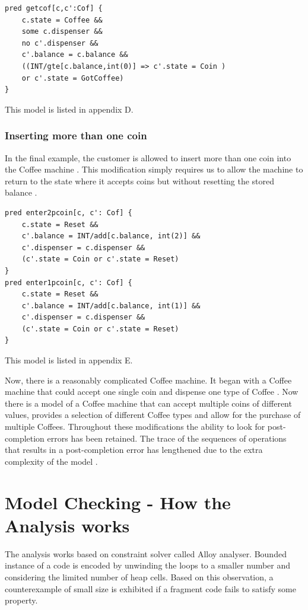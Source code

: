 \documentclass[a4paper,12pt]{report}
\begin{document}
\begin{verbatim}
pred getcof[c,c':Cof] {
	c.state = Coffee &&
	some c.dispenser &&
	no c'.dispenser &&
	c'.balance = c.balance &&
	((INT/gte[c.balance,int(0)] => c'.state = Coin )
	or c'.state = GotCoffee)
}
\end{verbatim}

This model is listed in appendix D.

\subsection{Inserting more than one coin}
\label{Inserting more than one coin}

In the final example, the customer is allowed to insert more than one coin into the Coffee machine \cite{RussellBoyatt}. This modification simply requires us to allow the machine to return to the state where it accepts coins but without resetting the stored balance \cite{RussellBoyatt}.

\begin{verbatim}
pred enter2pcoin[c, c': Cof] {
	c.state = Reset &&
	c'.balance = INT/add[c.balance, int(2)] &&
	c'.dispenser = c.dispenser &&
	(c'.state = Coin or c'.state = Reset)
}
pred enter1pcoin[c, c': Cof] {
	c.state = Reset &&
	c'.balance = INT/add[c.balance, int(1)] &&
	c'.dispenser = c.dispenser &&
	(c'.state = Coin or c'.state = Reset)
}
\end{verbatim}

This model is listed in appendix E.

Now, there is a reasonably complicated Coffee machine. It began with a Coffee machine that could accept one single coin and dispense one type of Coffee \cite{RussellBoyatt}. Now there is a model of a Coffee machine that can accept multiple coins of different values, provides a selection of different Coffee types and allow for the purchase of multiple Coffees. Throughout these modifications the ability to look for post-completion errors has been retained. The trace of the sequences of operations that results in a post-completion error has lengthened due to the extra complexity of the model \cite{RussellBoyatt}.
 

\chapter{Model Checking - How the Analysis works}
\label{Working of analysis}

The analysis works based on constraint solver called Alloy analyser. Bounded instance of a code is encoded by unwinding the loops to a smaller number and considering the limited number of heap cells. Based on this observation, a counterexample of small size is exhibited if a fragment code fails to satisfy some property. 
\end{document}
